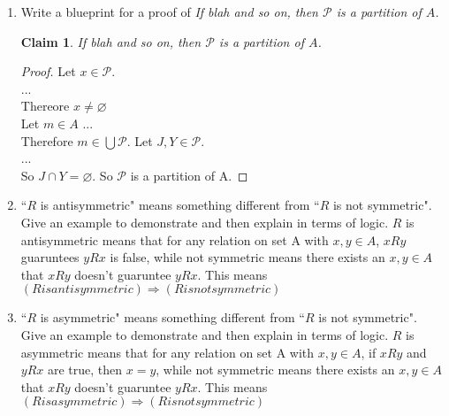 \documentclass[11pt]{letter}
\newtheorem{claim}{Claim}
\theoremstyle{definition}
\begin{document}
\begin{description}
\begin{enumerate}
          
		\item Write a blueprint for a proof of {\em If blah and so on, then $\mathcal{P}$ is a partition of $A$.}
                  \begin{claim}
                    If blah and so on, then $\mathcal{P}$ is a partition of $A$.
                  \end{claim}
                  \begin{proof}
                    Let $x\in \mathcal{P}$.\\
                    ...\\
                    Thereore $x\neq \varnothing$\\
                    Let $m\in A$
                    ...\\
                    Therefore $m\in \bigcup \mathcal{P}$.
                    Let $J,Y\in \mathcal{P}$.\\
                    ...\\
                    So $J\cap Y=\varnothing$.
                    So $\mathcal{P}$ is a partition of A.
                  \end{proof}
                  
                  
		\item ``$R$ is antisymmetric" means something different from ``$R$ is not symmetric". Give an example to demonstrate and then explain in terms of logic.
                 $R$ is antisymmetric means that for any relation on set A with $x,y\in A$, $xRy$ guaruntees $yRx$ is false, while not symmetric means there exists an $x,y\in A$ that $xRy$ doesn't guaruntee $yRx$. This means $(R is antisymmetric)\Rightarrow (R is not symmetric)$
                  
		\item ``$R$ is asymmetric" means something different from ``$R$ is not symmetric". Give an example to demonstrate and then explain in terms of logic.
                  $R$ is asymmetric means that for any relation on set A with $x,y\in A$, if $xRy$ and $yRx$ are true, then $x=y$, while not symmetric means there exists an $x,y\in A$ that $xRy$ doesn't guaruntee $yRx$. This means $(R is asymmetric)\Rightarrow (R is not symmetric)$
	\end{enumerate}\bigskip


\end{description}
\end{document}
